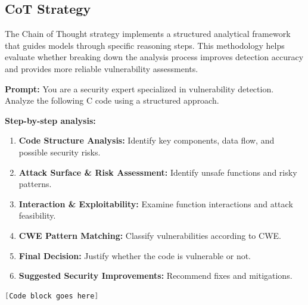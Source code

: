 \documentclass[sigconf]{acmart}
\begin{document}
\subsection{CoT Strategy}
The Chain of Thought strategy implements a structured analytical framework that guides models through specific reasoning steps. This methodology helps evaluate whether breaking down the analysis process improves detection accuracy and provides more reliable vulnerability assessments.
\begin{tcolorbox}[colback=redbox, colframe=red!60!black, 
title=\textbf{CoT Strategy}, 
sharp corners=south, boxrule=1pt, width=\linewidth]
\textbf{Prompt:}  
You are a security expert specialized in vulnerability detection. Analyze the following C code using a structured approach.

\textbf{Step-by-step analysis:}
\begin{enumerate}
    \item \textbf{Code Structure Analysis:} Identify key components, data flow, and possible security risks.
    \item \textbf{Attack Surface \& Risk Assessment:} Identify unsafe functions and risky patterns.
    \item \textbf{Interaction \& Exploitability:} Examine function interactions and attack feasibility.
    \item \textbf{CWE Pattern Matching:} Classify vulnerabilities according to CWE.
    \item \textbf{Final Decision:} Justify whether the code is vulnerable or not.
    \item \textbf{Suggested Security Improvements:} Recommend fixes and mitigations.
\end{enumerate}

\begin{lstlisting}[language=C, 
                  backgroundcolor=\color{codebg},
                  basicstyle=\footnotesize\ttfamily,
                  breaklines=true,
                  frame=none]
[Code block goes here]
\end{lstlisting}
\end{tcolorbox}

\end{document}
